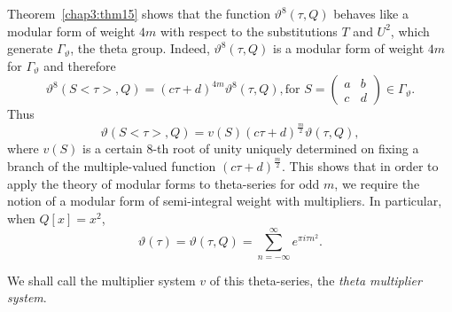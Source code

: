 Theorem~\ref{chap3:thm15} shows that the function $\vartheta^8(\tau,Q)$ behaves like
a modular form of weight $4m$ with respect to the substitutions $T$
and $U^2$, which generate $\Gamma_{\vartheta}$, the theta
group. Indeed, $\vartheta^8(\tau,Q)$ is a modular form of weight $4m$
for $\Gamma_{\vartheta}$ and therefore 
$$
\vartheta^8(S<\tau>,Q) = (c\tau+d)^{4m} \vartheta^8(\tau, Q), \text{
  for } S = \begin{pmatrix}
a&b\\c&d
\end{pmatrix} \in \Gamma_{\vartheta}. 
$$
Thus
$$
\vartheta(S<\tau>, Q) = v(S) (c\tau+d)^{\frac{m}{2}}
\vartheta(\tau,Q), 
$$
where $v(S)$ is a certain $8$-th root of unity uniquely determined on
fixing a branch of the multiple-valued function
$(c\tau+d)^{\frac{m}{2}}$. This shows that in order to apply the
theory of modular forms to theta-series for odd $m$, we require the
notion of a modular form of semi-integral weight with multipliers. In
particular, when $Q[x]=x^2$,
$$
\vartheta(\tau) = \vartheta(\tau, Q) = \sum^{\infty}_{n=-\infty}
e^{\pi i \tau n^2}. 
$$

We shall call the multiplier system $v$ of this theta-series, the
\textit{theta multiplier system}.

